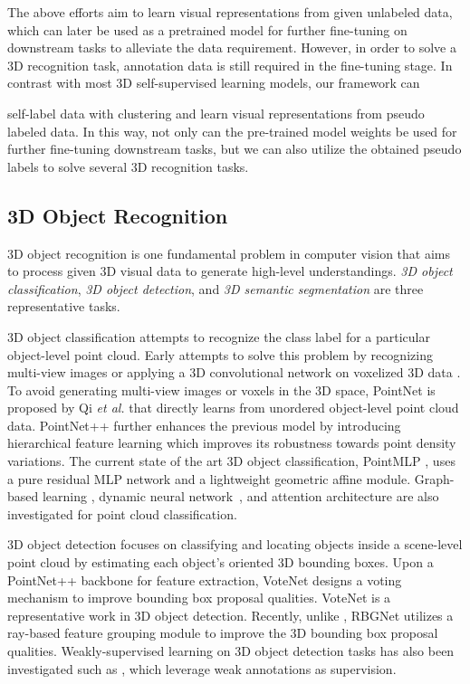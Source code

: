 \documentclass{article}
\begin{document}
The above efforts aim to learn visual representations from  given unlabeled data, which can later be used as a pretrained model for further fine-tuning on downstream tasks to alleviate the data requirement. However, in order to solve a 3D recognition task, annotation data is still required in the fine-tuning stage. In contrast with most 3D self-supervised learning models, our framework can

self-label data with clustering and learn visual representations  from pseudo labeled data. 
In this way, not only can the pre-trained model weights be used for further fine-tuning downstream tasks, but we can also utilize the obtained pseudo labels to solve several 3D recognition tasks.

\subsection{3D Object Recognition} 

3D object recognition is one fundamental problem in computer vision that aims to process given 3D visual data to generate high-level understandings. \textit{3D object classification}, \textit{3D object detection}, and \textit{3D semantic segmentation} are three representative tasks.

{3D object classification} attempts to recognize the class label for a particular object-level point cloud. Early attempts to solve this problem by recognizing multi-view images  \cite{su2015multi,yu2018multi,yavartanoo2018spnet} or applying a 3D convolutional network on voxelized 3D data \cite{maturana2015voxnet,wu20153d}. To avoid generating multi-view images or voxels in the 3D space, PointNet \cite{qi2017pointnet} is proposed by Qi \textit{et al.} that directly learns from unordered object-level point cloud data. PointNet++ \cite{qi2017pointnetplusplus} further enhances the previous model by introducing hierarchical feature learning which improves its robustness towards point density variations. The current state of the art 3D object classification, PointMLP \cite{ma2022rethinking}, uses a pure residual MLP network and a lightweight geometric affine module. Graph-based learning \cite{wang2019dynamic,li2019deepgcns}, dynamic neural network~\cite{xu2021paconv}, and attention architecture \cite{zhao2021point,guo2021pct} are also 
investigated for point cloud classification.

{3D object detection} focuses on classifying and locating objects inside a scene-level point cloud by estimating each object's oriented 3D bounding boxes. Upon a PointNet++ backbone for feature extraction, VoteNet \cite{qi2019deep} designs a voting mechanism to improve bounding box proposal qualities. VoteNet is a representative work in 3D object detection. Recently, unlike \cite{qi2019deep}, RBGNet \cite{wang2022rbgnet} utilizes a ray-based feature grouping module to improve the 3D bounding box proposal qualities.  Weakly-supervised learning on 3D object detection tasks has also been investigated such as \cite{ren2021wypr,xu2022back}, which leverage weak annotations as supervision.
\end{document}
